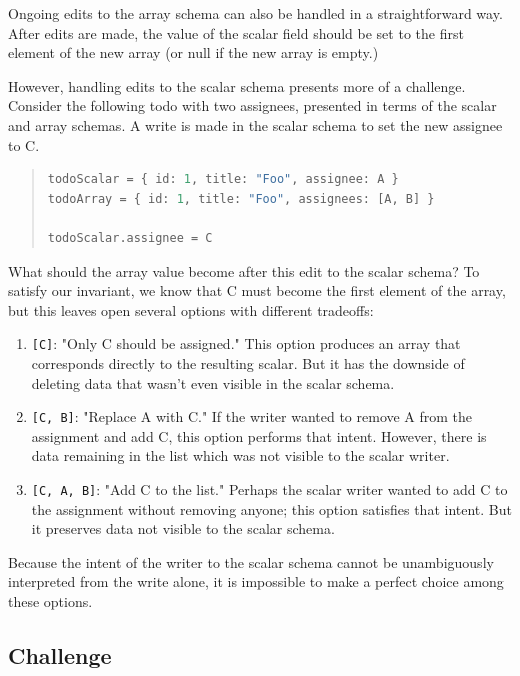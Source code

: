 \documentclass[english,submission]{programming}
\begin{document}
Ongoing edits to the array schema can also be handled in a straightforward way. After edits are made, the value of the scalar field should be set to the first element of the new array (or null if the new array is empty.)

However, handling edits to the scalar schema presents more of a challenge. Consider the following todo with two assignees, presented in terms of the scalar and array schemas. A write is made in the scalar schema to set the new assignee to C.

\begin{quote}
\begin{lstlisting}[language=ml]
todoScalar = { id: 1, title: "Foo", assignee: A }
todoArray = { id: 1, title: "Foo", assignees: [A, B] }

todoScalar.assignee = C
\end{lstlisting}
\end{quote}

What should the array value become after this edit to the scalar schema? To satisfy our invariant, we know that C must become the first element of the array, but this leaves open several options with different tradeoffs:

\begin{enumerate}
  \item \texttt{[C]}: "Only C should be assigned." This option produces an array that corresponds directly to the resulting scalar. But it has the downside of deleting data that wasn't even visible in the scalar schema.
  \item \texttt{[C, B]}: "Replace A with C." If the writer wanted to remove A from the assignment and add C, this option performs that intent. However, there is data remaining in the list which was not visible to the scalar writer.
  \item \texttt{[C, A, B]}: "Add C to the list." Perhaps the scalar writer wanted to add C to the assignment without removing anyone; this option satisfies that intent. But it preserves data not visible to the scalar schema.
\end{enumerate}

Because the intent of the writer to the scalar schema cannot be unambiguously interpreted from the write alone, it is impossible to make a perfect choice among these options.

\subsection{Challenge}
\end{document}
